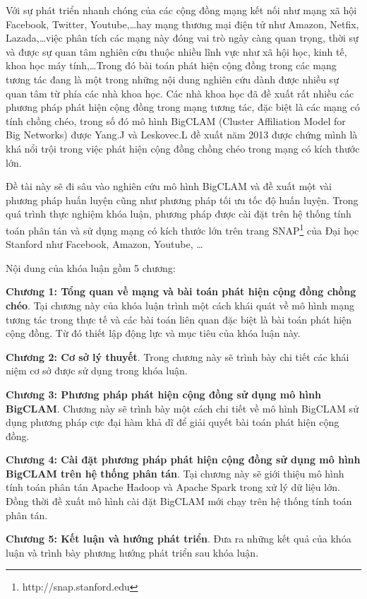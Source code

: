  
\begin{abstracts}  
Với sự phát triển nhanh chóng của các cộng đồng mạng kết nối như mạng xã hội Facebook, Twitter, Youtube,\dots hay mạng thương mại điện tử như Amazon, Netfix, Lazada,\dots việc phân tích các mạng này đóng vai trò ngày càng quan trọng, thời sự và được sự quan tâm nghiên cứu thuộc nhiều lĩnh vực như xã hội học, kinh tế, khoa học máy tính,\dots Trong đó bài toán phát hiện cộng đồng trong các mạng tương tác đang là một trong những nội dung nghiên cứu dành được nhiều sự quan tâm từ phía các nhà khoa học. Các nhà khoa học đã đề xuất rất nhiều các phương pháp phát hiện cộng đồng trong mạng tương tác, đặc biệt là các mạng có tính chồng chéo, trong số đó mô hình BigCLAM (Cluster Affiliation Model for Big Networks) được Yang.J và Leskovec.L đề xuất năm 2013 được chứng mình là khá nổi trội trong việc phát hiện cộng đồng chồng chéo trong mạng có kích thước lớn.

Đề tài này sẽ đi sâu vào nghiên cứu mô hình BigCLAM và đề xuất một vài phương pháp huấn luyện cũng như phương pháp tối ưu tốc độ huấn luyện. Trong quá trình thực nghiệm khóa luận, phương pháp được cài đặt trên hệ thống tính toán phân tán và sử dụng mạng có kích thước lớn trên trang SNAP\footnote{http://snap.stanford.edu} của Đại học Stanford như Facebook, Amazon, Youtube, \dots

Nội dung của khóa luận gồm 5 chương:

\textbf{Chương 1: Tổng quan về mạng và bài toán phát hiện cộng đồng chồng chéo}. Tại chương này của khóa luận trình một cách khái quát về mô hình mạng tương tác trong thực tế và các bài toán liên quan đặc biệt là bài toán phát hiện cộng đồng. Từ đó thiết lập động lực và mục tiêu của khóa luận này.

\textbf{Chương 2: Cơ sở lý thuyết}. Trong chương này sẽ trình bày chi tiết các khái niệm cơ sở được sử dụng trong khóa luận.

\textbf{Chương 3: Phương pháp phát hiện cộng đồng sử dụng mô hình BigCLAM}. Chương này sẽ trình bày một cách chi tiết về mô hình BigCLAM sử dụng phương pháp cực đại hàm khả dĩ để giải quyết bài toán phát hiện cộng đồng.

\textbf{Chương 4: Cài đặt phương pháp phát hiện cộng đồng sử dụng mô hình BigCLAM trên hệ thống phân tán}. Tại chương này sẽ giới thiệu mô hình tính toán phân tán Apache Hadoop và Apache Spark trong xử lý dữ liệu lớn. Đồng thời đề xuất mô hình cài đặt BigCLAM mới chạy trên hệ thống tính toán phân tán.

\textbf{Chương 5: Kết luận và hướng phát triển}. Đưa ra những kết quả của khóa luận và trình bày phương hướng phát triển sau khóa luận.

\end{abstracts}
 
